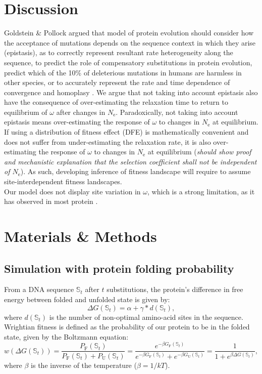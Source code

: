 \documentclass{article}
\newcommand{\Ne}{N_{\mathrm{e}}}
\newcommand{\dnds}{\omega}
\newcommand{\ci}{\mathbb{S}_{t}}
\newcommand{\phenoFold}{\Delta G}
\newcommand{\phenoFoldMin}{\alpha}
\newcommand{\dphenoFold}{\gamma}
\begin{document}
\section{Discussion}

Goldstein \& Pollock argued that model of protein evolution should consider how the acceptance of mutations depends on the sequence context in which they arise (epistasis), as to correctly represent resultant rate heterogeneity along the sequence, to predict the role of compensatory substitutions in protein evolution, predict which of the 10\% of deleterious mutations in humans are harmless in other species, or to accurately represent the rate and time dependence of convergence and homoplasy \cite{Goldstein2017}.
We argue that not taking into account epistasis also have the consequence of over-estimating the relaxation time to return to equilibrium of $\dnds$ after changes in $\Ne$.
Paradoxically, not taking into account epistasis means over-estimating the response of $\dnds$ to changes in $\Ne$ at equilibrium.\\

If using a distribution of fitness effect (DFE) is mathematically convenient and does not suffer from under-estimating the relaxation rate, it is also over-estimating the response of $\dnds$ to changes in $\Ne$ at equilibrium (\textit{should show proof and mechanistic explanation that the selection coefficient shall not be independent of $\Ne$}).
As such, developing inference of fitness landscape will require to assume site-interdependent fitness landscapes.\\

Our model does not display site variation in $\dnds$, which is a strong limitation, as it has observed in most protein \cite{Echave2017}.
\section{Materials \& Methods}

\subsection{Simulation with protein folding probability}
\label{MatMet:folding}
From a DNA sequence $\ci$ after $t$ substitutions, the protein's difference in free energy between folded and unfolded state is given by:
\begin{equation*}
\phenoFold\left(\ci\right) = \phenoFoldMin + \dphenoFold * d\left(\ci\right), 
\end{equation*}
where $d\left(\ci\right)$ is the number of non-optimal amino-acid sites in the sequence.
Wrightian fitness is defined as the probability of our protein to be in the folded state, given by the Boltzmann equation: 
\begin{equation}
w(\phenoFold\left(\ci\right)) = \dfrac{P_{\mathrm{F}}\left(\ci\right)}{P_{\mathrm{F}}\left(\ci\right) + P_{\mathrm{U}}\left(\ci\right)} = \dfrac{e^{-\beta G_{\mathrm{F}}\left(\ci\right) }}{e^{-\beta G_{\mathrm{F}} \left(\ci\right) } + e^{-\beta G_{\mathrm{U}}\left(\ci\right) }} = \dfrac{1}{1 + e^{\beta \phenoFold\left(\ci\right) }}, 
\end{equation}
where $\beta$ is the inverse of the temperature ($\beta=1/kT$).
\end{document}
